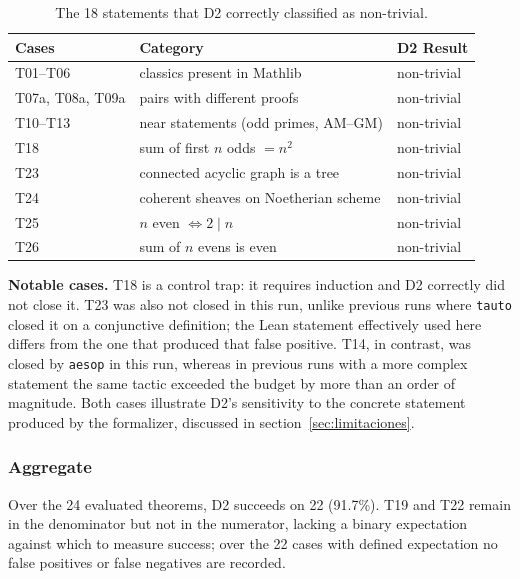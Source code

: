 \documentclass{article}
\theoremstyle{remark}
\begin{document}
\begin{table}[htbp]
\centering
\small
\setlength{\tabcolsep}{5pt}
\begin{tabular}{p{4.6cm}p{6.4cm}l}
\toprule
Cases & Category & D2 Result \\
\midrule
T01--T06                & classics present in Mathlib            & non-trivial \\
T07a, T08a, T09a        & pairs with different proofs          & non-trivial \\
T10--T13                & near statements (odd primes, AM--GM) & non-trivial \\
T18                     & sum of first $n$ odds $= n^2$ & non-trivial \\
T23                     & connected acyclic graph is a tree         & non-trivial \\
T24                     & coherent sheaves on Noetherian scheme & non-trivial \\
T25                     & $n$ even $\iff 2 \mid n$                  & non-trivial \\
T26                     & sum of $n$ evens is even                 & non-trivial \\
\bottomrule
\end{tabular}
\caption{The 18 statements that D2 correctly classified as non-trivial.}
\label{tab:d2notrivial}
\end{table}

\textbf{Notable cases.} T18 is a control trap: it requires induction and D2 correctly did not close it. T23 was also not closed in this run, unlike previous runs where \texttt{tauto} closed it on a conjunctive definition; the Lean statement effectively used here differs from the one that produced that false positive. T14, in contrast, was closed by \texttt{aesop} in this run, whereas in previous runs with a more complex statement the same tactic exceeded the budget by more than an order of magnitude. Both cases illustrate D2's sensitivity to the concrete statement produced by the formalizer, discussed in section~\ref{sec:limitaciones}.

\subsubsection*{Aggregate}

Over the 24 evaluated theorems, D2 succeeds on 22 (91.7\%). T19 and T22 remain in the denominator but not in the numerator, lacking a binary expectation against which to measure success; over the 22 cases with defined expectation no false positives or false negatives are recorded.
\end{document}
